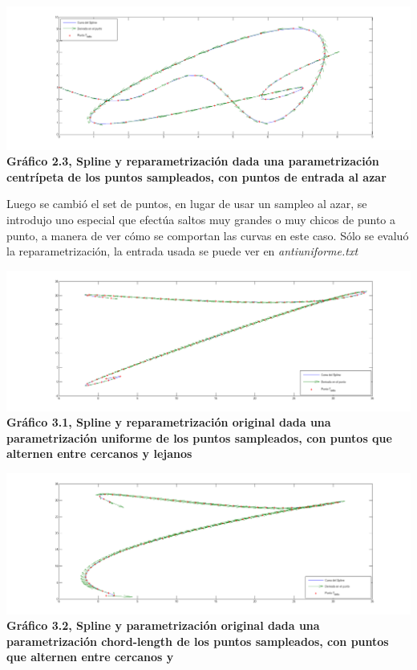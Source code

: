 \begin{center}
\includegraphics[scale=0.4]{../img/Centripeta-repa-rand.png} \\
\scriptsize{\textsf{\textbf{Gr\'afico 2.3, Spline y reparametrización dada una parametrización centrípeta de los puntos sampleados, con puntos de entrada al azar}}}
\end{center}


Luego se cambió el set de puntos, en lugar de usar un sampleo al azar, se introdujo uno especial que efectúa saltos muy grandes o muy chicos de punto a punto, a manera de ver cómo se comportan las curvas en este caso. Sólo se evaluó la reparametrización, la entrada usada se puede ver en \textit{antiuniforme.txt}


\begin{center}
\includegraphics[scale=0.4]{../img/uniforme-antiu.png} \\
\scriptsize{\textsf{\textbf{Gr\'afico 3.1, Spline y reparametrización original dada una parametrización uniforme de los puntos sampleados, con puntos que alternen entre cercanos y lejanos}}}
\end{center}

\begin{center}
\includegraphics[scale=0.4]{../img/chord-antiu.png} \\
\scriptsize{\textsf{\textbf{Gr\'afico 3.2, Spline y parametrización original dada una parametrización chord-length de los puntos sampleados, con puntos que alternen entre cercanos y}}}
\end{center}

